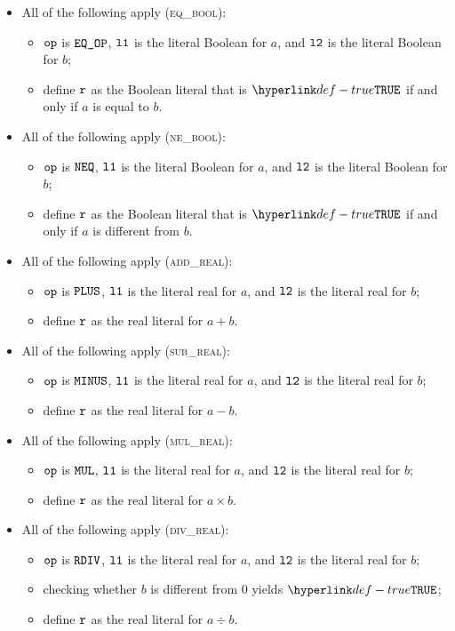 \documentclass{book}
\newcommand\ProseOrTypeError[0]{\ProseTerminateAs{\TypeErrorConfig}}
\begin{document}
\begin{itemize}
  \item All of the following apply (\textsc{eq\_bool}):
  \begin{itemize}
    \item $\texttt{op}$ is $\texttt{EQ\_OP}$, $\texttt{l1}$ is the literal Boolean for $a$, and $\texttt{l2}$ is the literal Boolean for $b$;
    \item define $\texttt{r}$ as the Boolean literal that is $\True$ if and only if $a$ is equal to $b$.
  \end{itemize}

  \item All of the following apply (\textsc{ne\_bool}):
  \begin{itemize}
    \item $\texttt{op}$ is $\texttt{NEQ}$, $\texttt{l1}$ is the literal Boolean for $a$, and $\texttt{l2}$ is the literal Boolean for $b$;
    \item define $\texttt{r}$ as the Boolean literal that is $\True$ if and only if $a$ is different from $b$.
  \end{itemize}

  \item All of the following apply (\textsc{add\_real}):
  \begin{itemize}
    \item $\texttt{op}$ is $\texttt{PLUS}$, $\texttt{l1}$ is the literal real for $a$, and $\texttt{l2}$ is the literal real for $b$;
    \item define $\texttt{r}$ as the real literal for $a + b$.
  \end{itemize}

  \item All of the following apply (\textsc{sub\_real}):
  \begin{itemize}
    \item $\texttt{op}$ is $\texttt{MINUS}$, $\texttt{l1}$ is the literal real for $a$, and $\texttt{l2}$ is the literal real for $b$;
    \item define $\texttt{r}$ as the real literal for $a - b$.
  \end{itemize}

  \item All of the following apply (\textsc{mul\_real}):
  \begin{itemize}
    \item $\texttt{op}$ is $\texttt{MUL}$, $\texttt{l1}$ is the literal real for $a$, and $\texttt{l2}$ is the literal real for $b$;
    \item define $\texttt{r}$ as the real literal for $a \times b$.
  \end{itemize}

  \item All of the following apply (\textsc{div\_real}):
  \begin{itemize}
    \item $\texttt{op}$ is $\texttt{RDIV}$, $\texttt{l1}$ is the literal real for $a$, and $\texttt{l2}$ is the literal real for $b$;
    \item checking whether $b$ is different from $0$ yields $\True$\ProseOrTypeError;
    \item define $\texttt{r}$ as the real literal for $a \div b$.
  \end{itemize}


\end{itemize}
\end{document}
